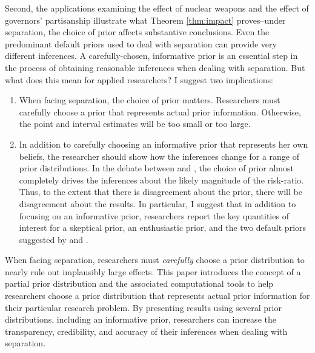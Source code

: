 \documentclass[12pt]{article}
\begin{document}
Second, the applications examining the effect of nuclear weapons and the effect of governors' partisanship illustrate what Theorem \ref{thm:impact} proves--under separation, the choice of prior affects substantive conclusions. 
Even the predominant default priors used to deal with separation can provide very different inferences. 
A carefully-chosen, informative prior is an essential step in the process of obtaining reasonable inferences when dealing with separation. 
But what does this mean for applied researchers? 
I suggest two implications:
\begin{enumerate}
\item When facing separation, the choice of prior matters. 
Researchers must carefully choose a prior that represents actual prior information. 
Otherwise, the point and interval estimates will be too small or too large.
\item In addition to carefully choosing an informative prior that represents her own beliefs, the researcher should show how the inferences change for a range of prior distributions. 
In the debate between \cite{BellMiller2015} and \cite{Rauchhaus2009}, the choice of prior almost completely drives the inferences about the likely magnitude of the risk-ratio. 
Thus, to the extent that there is disagreement about the prior, there will be disagreement about the results. 
In particular, I suggest that in addition to focusing on an informative prior, researchers report the key quantities of interest for a skeptical prior, an enthusiastic prior, and the two default priors suggested by \cite{Zorn2005} and \cite{Gelmanetal2008}.
\end{enumerate}

When facing separation, researchers must \emph{carefully} choose a prior distribution to nearly rule out implausibly large effects. 
This paper introduces the concept of a partial prior distribution and the associated computational tools to help researchers choose a prior distribution that represents actual prior information for their particular research problem. 
By presenting results using several prior distributions, including an informative prior, researchers can increase the transparency, credibility, and accuracy of their inferences when dealing with separation.

\singlespace


%
\end{document}
